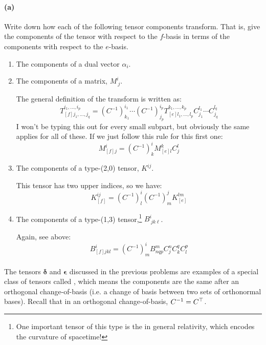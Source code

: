 \documentclass{article}
\begin{document}
\phline
\paragraph{(a)}
Write down how each of the following tensor components transform.  That is, give the components of the tensor with respect to the $f$-basis in terms of the components 
with respect to the $e$-basis.
	\begin{enumerate}
		\item {}  The components of a dual vector $\alpha_{i}$.
		\item The components of a matrix, $M^{i}_{\ j}$.

			\begin{solution}
				The general definition of the transform is written as:
				\[
					T^{i_1, \dots, i_p}_{[f] j_1, \dots, j_q} = (C^{-1})^{i_1}_{k_1} \cdots (C^{-1})^{i_p}_{j_p}
					T^{k_1, \dots, k_p}_{[e] l_1, \dots, l_p} C^{l_1}_{j_1} \cdots C^{l_q}_{j_q}
				\] 
				I won't be typing this out for every small subpart, but obviously the same applies for all 
				of these. If we just follow this rule for this first one:
				\[
					M^i_{[f] j} = (C^{-1})^i_k M^k_{[e]l}C^l_j
				\] 

			\end{solution}
		\item The components of a type-(2,0) tensor, $K^{ij}$.

			\begin{solution}
				This tensor has two upper indices, so we have:
				\[
					K^{ij}_{[f]} = (C^{-1})^i_l(C^{-1})^j_m K^{lm}_{[e]}
				\] 
			\end{solution}
		\item The components of a type-(1,3) tensor,\footnote{One important tensor of this type is the  in general relativity,
		which encodes the curvature of spacetime!} $B^{i}_{\ jk\ell}$.

		\begin{solution}
			Again, see above:
			\[
				B^i_{[f]jkl} = (C^{-1})^i_m B^m_{nqp} C^n_j C^q_k C^p_l
			\] 
		\end{solution}
	\end{enumerate}

\phline
\paragraph{}
The tensors $\boldsymbol{\delta}$ and $\boldsymbol{\epsilon}$ discussed in the previous problems are examples of a special class of tensors called , 
which means the components are the same after an orthogonal change-of-basis (i.e. a change of basis between two sets of orthonormal bases).  
Recall that in an orthogonal change-of-basis, ${C}^{-1}={C}^{\top}$.
\end{document}
